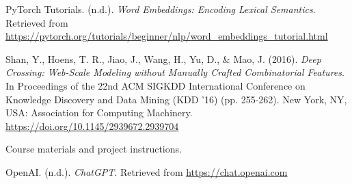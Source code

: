 \documentclass{article}
\begin{document}
\begin{thebibliography}{}

PyTorch Tutorials. (n.d.). \emph{Word Embeddings: Encoding Lexical Semantics}. Retrieved from \url{https://pytorch.org/tutorials/beginner/nlp/word_embeddings_tutorial.html}

Shan, Y., Hoens, T. R., Jiao, J., Wang, H., Yu, D., \& Mao, J. (2016). \emph{Deep Crossing: Web-Scale Modeling without Manually Crafted Combinatorial Features}. In Proceedings of the 22nd ACM SIGKDD International Conference on Knowledge Discovery and Data Mining (KDD '16) (pp. 255-262). New York, NY, USA: Association for Computing Machinery. \url{https://doi.org/10.1145/2939672.2939704}

Course materials and project instructions.

OpenAI. (n.d.). \emph{ChatGPT}. Retrieved from \url{https://chat.openai.com}

\end{thebibliography}
\end{document}
